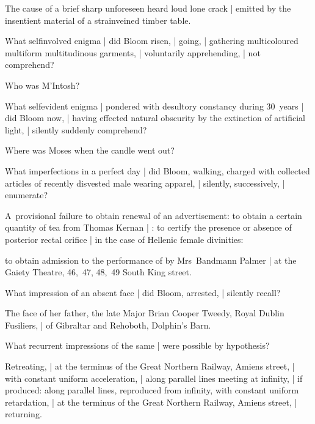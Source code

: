 \Household
The cause of a brief sharp unforeseen heard loud lone crack |
emitted by the insentient material of a strainveined timber table.



What selfinvolved enigma |
did Bloom risen, |
going, |
gathering multicoloured multiform multitudinous garments, |
voluntarily apprehending, |
not comprehend?

\Memories
Who was M'Intosh?


What selfevident enigma |
pondered with desultory constancy during 30~years |
did Bloom now, |
having effected natural obscurity by the extinction of artificial light, |
silently suddenly comprehend?

\Poetry
Where was Moses
when the candle went out?



What imperfections in a perfect day |
did Bloom,
walking,
charged with collected articles of recently disvested male wearing apparel, |
silently, successively, |
enumerate?

\Memories
A~provisional failure to obtain renewal of an advertisement:
to obtain a certain quantity of tea from Thomas Kernan |
:
to certify the presence or absence of posterior rectal orifice |
in the case of Hellenic female divinities:

\Places
to obtain admission
to the performance of  by Mrs~Bandmann Palmer |
at the Gaiety Theatre,
46,~47, 48,~49 South King street.


What impression of an absent face |
did Bloom,
arrested, |
silently recall?

\Memories
The face of her father,
the late Major Brian Cooper Tweedy,
Royal Dublin Fusiliers, |
of Gibraltar and Rehoboth, Dolphin's Barn.


What recurrent impressions of the same |
were possible by hypothesis?

\Science
Retreating, |
at the terminus of the Great Northern Railway, Amiens street, |
with constant uniform acceleration, |
along parallel lines meeting at infinity, |
if produced:
along parallel lines,
reproduced from infinity,
with constant uniform retardation, |
at the terminus of the Great Northern Railway, Amiens street, |
returning.



